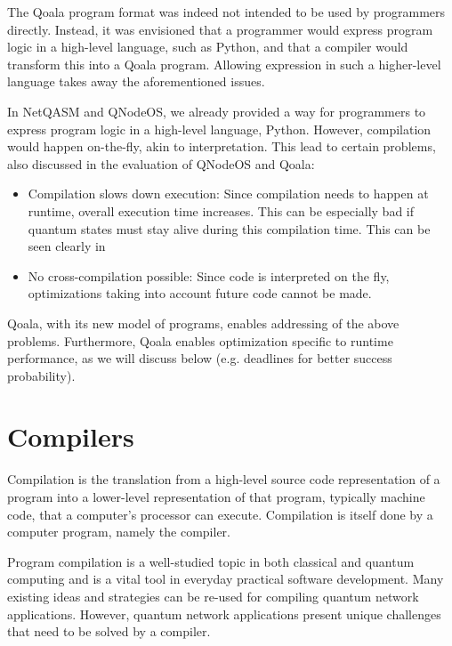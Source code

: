 The Qoala program format was indeed not intended to be used by programmers directly.
Instead, it was envisioned that a programmer would express program logic in a high-level language, such as Python, and that a compiler would transform this into a Qoala program.
Allowing expression in such a higher-level language takes away the aforementioned issues.


In NetQASM and QNodeOS, we already provided a way for programmers to express program logic in a high-level language, Python.
However, compilation would happen on-the-fly, akin to interpretation.
This lead to certain problems, also discussed in the evaluation of QNodeOS and Qoala:
\begin{itemize}
  \item Compilation slows down execution:
    Since compilation needs to happen at runtime, overall execution time increases.
    This can be especially bad if quantum states must stay alive during this compilation time.
    This can be seen clearly in 
  \item No cross-compilation possible:
    Since code is interpreted on the fly, optimizations taking into account future code cannot be made. 
\end{itemize}

Qoala, with its new model of programs, enables addressing of the above problems.
Furthermore, Qoala enables optimization specific to runtime performance, as we will discuss below (e.g. deadlines for better success probability).


\section{Compilers}
Compilation is the translation from a high-level source code representation of a program into a lower-level representation of that program, typically machine code, that a computer's processor can execute.
Compilation is itself done by a computer program, namely the compiler.

Program compilation is a well-studied topic in both classical and quantum computing and is a vital tool in everyday practical software development.
Many existing ideas and strategies can be re-used for compiling quantum network applications.
However, quantum network applications present unique challenges that need to be solved by a compiler.

